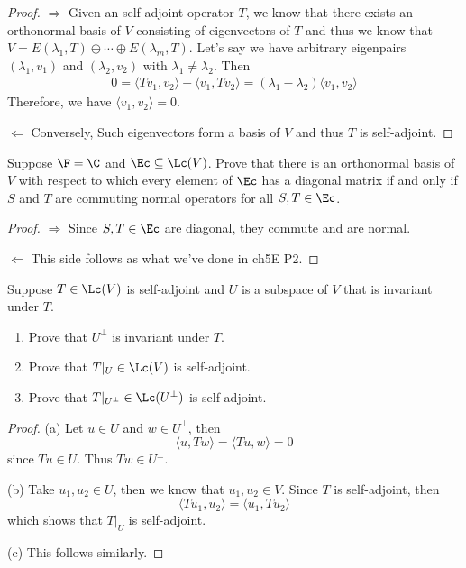 \documentclass{extarticle}
\begin{document}
\begin{proof}
\(\Rightarrow\) Given an self-adjoint operator \(T\), we know that there exists an orthonormal basis
of \(V\) consisting of eigenvectors of \(T\) and thus we know that \(V = E(\lambda_1, T) \oplus
\cdots \oplus E(\lambda_m, T)\). Let's say we have arbitrary eigenpairs \((\lambda_1, v_1)\) and
\((\lambda_2, v_2)\) with \(\lambda_1 \neq \lambda_2\). Then
\begin{align*}
    0 = \langle Tv_1,v_2 \rangle - \langle v_1,Tv_2 \rangle
    = (\lambda_1 - \lambda_2) \langle v_1,v_2 \rangle
\end{align*}
Therefore, we have \(\langle v_1,v_2 \rangle = 0\).

\(\Leftarrow\) Conversely, Such eigenvectors form a basis of \(V\) and thus \(T\) is self-adjoint.
\end{proof}

\begin{problem}{16}
    Suppose \(\F = \C\) and \(\Ec \subseteq \Lc(V)\). Prove that there is an orthonormal basis of
    \(V\) with respect to which every element of \(\Ec\) has a diagonal matrix if and only if
    \(S\) and \(T\) are commuting normal operators for all \(S, T \in \Ec\).
\end{problem}

\begin{proof}
\(\Rightarrow\) Since \(S, T \in \Ec\) are diagonal, they commute and are normal.

\(\Leftarrow\) This side follows as what we've done in ch5E P2.
\end{proof}

\begin{problem}{19}
    Suppose \(T \in \Lc(V)\) is self-adjoint and \(U\) is a subspace of \(V\) that is invariant
    under \(T\).
    \begin{enumerate}[label=(\alph*)]
        \item Prove that \(U^\perp\) is invariant under \(T\).
        \item Prove that \(T|_U \in \Lc(V)\) is self-adjoint.
        \item Prove that \(T |_{U^\perp} \in \Lc(U^\perp)\) is self-adjoint.
    \end{enumerate}
\end{problem}

\begin{proof}
(a) Let \(u \in U\) and \(w \in U^\perp\), then
\[\langle u,Tw \rangle = \langle Tu,w \rangle = 0\]
since \(Tu \in U\). Thus \(Tw \in U^\perp\).

(b) Take \(u_1, u_2 \in U\), then we know that \(u_1, u_2 \in V\). Since \(T\) is self-adjoint, then
\[\langle Tu_1, u_2 \rangle = \langle u_1,Tu_2 \rangle\]
which shows that \(T|_U\) is self-adjoint.

(c) This follows similarly.
\end{proof}
\end{document}
